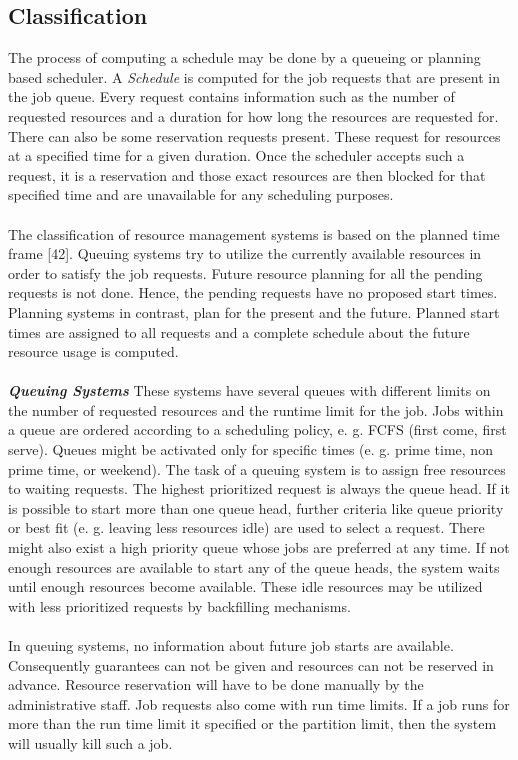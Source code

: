 \subsection{Classification}
The process of computing a schedule may be done by a queueing or planning based scheduler. A \textit{Schedule} is computed for the job requests that are present in the job queue. Every request contains information such as the number of requested resources and a duration for how long the resources are requested for. There can also be some reservation requests present. These request for resources at a specified time for a given duration. Once the scheduler accepts such a request, it is a reservation and those exact resources are then blocked for that specified time and are unavailable for any scheduling purposes.\\ \\
The classification of resource management systems is based on the planned time frame [42]. Queuing systems try to utilize the currently available resources in order to satisfy the job requests. Future resource planning for all the pending requests is not done. Hence, the pending requests have no proposed start times. Planning systems in contrast, plan for the present and the future. Planned start times are assigned to all requests and a complete schedule about the future resource usage is computed.\\ \\
\textbf{\textit{Queuing Systems }} These systems have several queues with different limits on the number of requested resources and the runtime limit for the job. Jobs within a queue are ordered according to a scheduling policy, e. g. FCFS (first come, first serve). Queues might be activated only for specific times (e. g. prime time, non prime time, or weekend). The task of a queuing system is to assign free resources to waiting requests. The highest prioritized request is always the queue head. If it is possible to start more than one queue head, further criteria like queue priority or best fit (e. g. leaving less resources idle) are used to select a request. There might also exist a high priority queue whose jobs are preferred at any time. If not enough resources are available to start any of the queue heads, the system waits until enough resources become available. These idle resources may be utilized with less prioritized requests by backfilling mechanisms.\\ \\
In queuing systems, no information about future job starts are available. Consequently guarantees can not be given and resources can not be reserved in advance. Resource reservation will have to be done manually by the administrative staff. Job requests also come with run time limits. If a job runs for more than the run time limit it specified or the partition limit, then the system will usually kill such a job.\\ \\
